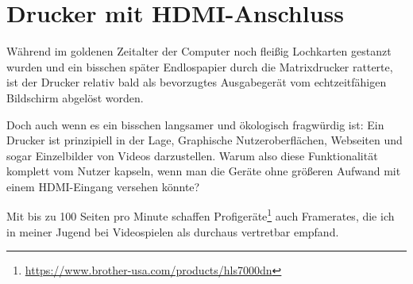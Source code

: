 \documentclass[a5paper,pagesize,10pt,bibtotoc,pointlessnumbers,normalheadings,DIV=9,twoside=false]{scrbook}
\begin{document}


\chapter{Drucker mit HDMI-Anschluss}

Während im goldenen Zeitalter der Computer noch fleißig Lochkarten gestanzt wurden und ein bisschen später Endlospapier durch die Matrixdrucker ratterte, ist der Drucker relativ bald als bevorzugtes Ausgabegerät vom echtzeitfähigen Bildschirm abgelöst worden.

Doch auch wenn es ein bisschen langsamer und ökologisch fragwürdig ist:
Ein Drucker ist prinzipiell in der Lage, Graphische Nutzeroberflächen, Webseiten und sogar Einzelbilder von Videos darzustellen.
Warum also diese Funktionalität komplett vom Nutzer kapseln, wenn man die Geräte ohne größeren Aufwand mit einem HDMI-Eingang versehen könnte?

Mit bis zu 100 Seiten pro Minute schaffen Profigeräte\footnote{\url{https://www.brother-usa.com/products/hls7000dn}} auch Framerates, die ich in meiner Jugend bei Videospielen als durchaus vertretbar empfand.

\end{document}
